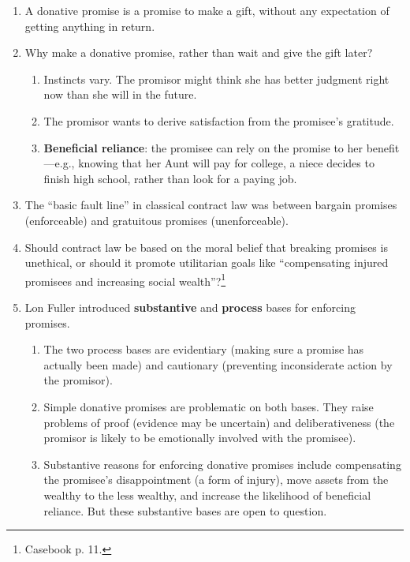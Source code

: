 \begin{enumerate}
    \item A donative promise is a promise to make a gift, without any 
    expectation of getting anything in return.
    \item Why make a donative promise, rather than wait and give the gift 
    later?
    \begin{enumerate}
        \item Instincts vary. The promisor might think she has better judgment 
        right now than she will in the future.
        \item The promisor wants to derive satisfaction from the promisee's 
        gratitude.
        \item \textbf{Beneficial reliance}: the promisee can rely on the 
        promise to her benefit---e.g., knowing that her Aunt will pay for 
        college, a niece decides to finish high school, rather than look for a 
        paying job.
    \end{enumerate}
    \item The ``basic fault line'' in classical contract law was between 
    bargain promises (enforceable) and gratuitous promises (unenforceable).
    \item Should contract law be based on the moral belief that breaking 
    promises is unethical, or should it promote utilitarian goals like 
    ``compensating injured promisees and increasing social 
    wealth''?\footnote{Casebook p. 11.}
    \item Lon Fuller introduced \textbf{substantive} and \textbf{process} 
    bases for enforcing promises.
    \begin{enumerate}
        \item The two process bases are evidentiary (making sure a promise 
        has actually been made) and cautionary (preventing inconsiderate 
        action by the promisor).
        \item Simple donative promises are problematic on both bases. They 
        raise problems of proof (evidence may be uncertain) and 
        deliberativeness (the promisor is likely to be emotionally involved 
        with the promisee).
        \item Substantive reasons for enforcing donative promises include 
        compensating the promisee's disappointment (a form of injury), move 
        assets from the wealthy to the less wealthy, and increase the 
        likelihood of beneficial reliance. But these substantive bases are 
        open to question.
    \end{enumerate}
\end{enumerate}

